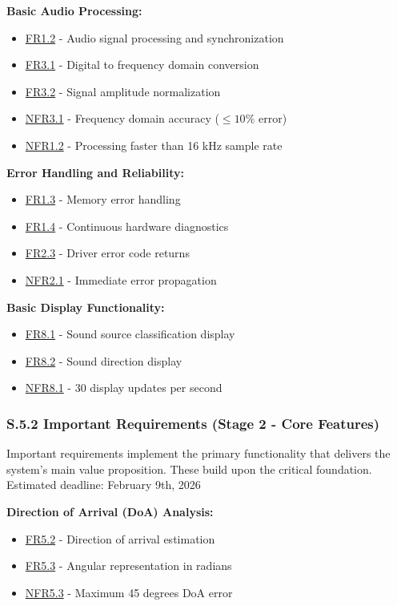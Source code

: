 \documentclass[12pt]{article}
\theoremstyle{definition}
\begin{document}
\textbf{Basic Audio Processing:}
\begin{itemize}
    \item \hyperref[FR1_2]{FR1.2} - Audio signal processing and synchronization
    \item \hyperref[FR3_1]{FR3.1} - Digital to frequency domain conversion
    \item \hyperref[FR3_2]{FR3.2} - Signal amplitude normalization
    \item \hyperref[NFR3_1]{NFR3.1} - Frequency domain accuracy ($\le 10\%$
    error)
    \item \hyperref[NFR1_2]{NFR1.2} - Processing faster than 16 kHz sample
    rate
\end{itemize}

\textbf{Error Handling and Reliability:}
\begin{itemize}
    \item \hyperref[FR1_3]{FR1.3} - Memory error handling
    \item \hyperref[FR1_4]{FR1.4} - Continuous hardware diagnostics
    \item \hyperref[FR2_3]{FR2.3} - Driver error code returns
    \item \hyperref[NFR2_1]{NFR2.1} - Immediate error propagation
\end{itemize}

\textbf{Basic Display Functionality:}
\begin{itemize}
    \item \hyperref[FR8_1]{FR8.1} - Sound source classification display
    \item \hyperref[FR8_2]{FR8.2} - Sound direction display
    \item \hyperref[NFR8_1]{NFR8.1} - 30 display updates per second
\end{itemize}

\subsubsection{S.5.2 Important Requirements (Stage 2 - Core Features)}

Important requirements implement the primary functionality that delivers the
system's main value proposition. These build upon the critical foundation. \\
\newline
Estimated deadline: February 9th, 2026 \\
\newline

\textbf{Direction of Arrival (DoA) Analysis:}
\begin{itemize}
    \item \hyperref[FR5_2]{FR5.2} - Direction of arrival estimation
    \item \hyperref[FR5_3]{FR5.3} - Angular representation in radians
    \item \hyperref[NFR5_3]{NFR5.3} - Maximum 45 degrees DoA error
\end{itemize}
\end{document}

